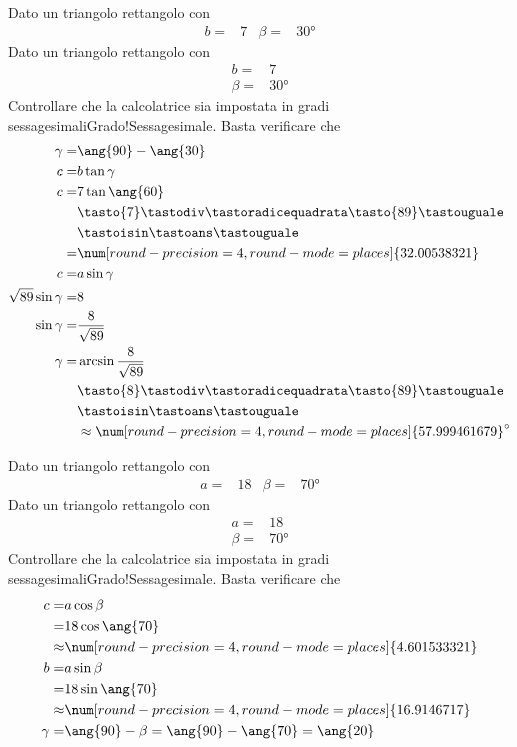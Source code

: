\begin{exercise}
	Dato un triangolo rettangolo con
	\begin{align*}
	b=&7&
	\beta=&\ang{30}
	\end{align*}
	\tcblower
		Dato un triangolo rettangolo con
	\begin{align*}
	b=&7\\
	\beta=&\ang{30}
	\end{align*}
	Controllare che la calcolatrice sia impostata in gradi sessagesimali{Grado!Sessagesimale}.
	Basta verificare che \testgradi 
	\begin{align*}
	\gamma=&\ang{90}-\ang{30}\\
	c=&b\tan\gamma\\
	c=&7\tan\ang{60}\\
	&\tasto{7}\tastodiv\tastoradicequadrata\tasto{89}\tastouguale\\
	&\tastoisin\tastoans\tastouguale\\
	=&\num[round-precision=\lungarrotandamento,round-mode=places]{32.00538321}\\
	c=&a\sin\gamma\\
	\sqrt{89}\sin\gamma=&8\\
	\sin\gamma=&\frac{8}{\sqrt{89}}\\
	\gamma=&\arcsin\frac{8}{\sqrt{89}}\\
	&\tasto{8}\tastodiv\tastoradicequadrata\tasto{89}\tastouguale\\
	&\tastoisin\tastoans\tastouguale\\
	&\approx\num[round-precision=\lungarrotandamento,round-mode=places]{57.999461679}^\circ\\
	\end{align*}
\end{exercise}
\begin{exercise}
	Dato un triangolo rettangolo con
	\begin{align*}
	a=&18&
	\beta=&\ang{70}
	\end{align*}
	\tcblower
	Dato un triangolo rettangolo con
	\begin{align*}
a=&18\\
\beta=&\ang{70}
\end{align*}
	Controllare che la calcolatrice sia impostata in gradi sessagesimali{Grado!Sessagesimale}.
	Basta verificare che \testgradi 
	\begin{align*}
c=&a\cos\beta\\
=&18\cos\ang{70}\\
	\approx&\num[round-precision=\lungarrotandamento,round-mode=places]{4.601533321}\\
b=&a\sin\beta\\
=&18\sin\ang{70}\\
\approx&\num[round-precision=\lungarrotandamento,round-mode=places]{16.9146717}\\
\gamma=&\ang{90}-\beta=\ang{90}-\ang{70}=\ang{20}\\
	\end{align*}
\end{exercise}
